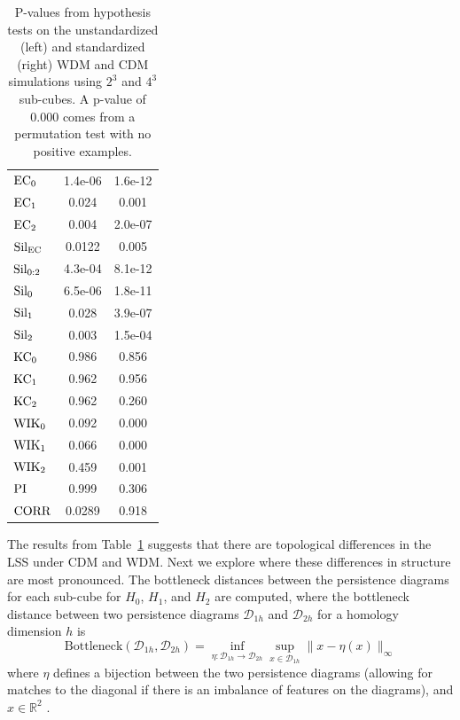 \documentclass[12pt]{article}
\begin{document}
\begin{table}[htp!]
\begin{center}
\begin{tabular}{ l | c |  c }
          $\textup{EC}_{0}$ & 1.4e-06 & 1.6e-12 \\
          $\textup{EC}_{1}$ & 0.024 & 0.001 \\
          $\textup{EC}_{2}$ & 0.004 & 2.0e-07 \\
          \midrule
          $\textup{Sil}_{\textup{EC}}$ & 0.0122 & 0.005 \\
          $\textup{Sil}_{0:2}$ & 4.3e-04 & 8.1e-12 \\
          $\textup{Sil}_{0}$ & 6.5e-06 & 1.8e-11 \\
          $\textup{Sil}_{1}$ & 0.028 & 3.9e-07 \\
          $\textup{Sil}_{2}$ & 0.003 & 1.5e-04 \\
          \midrule
          $\textup{KC}_{0}$ & 0.986 & 0.856 \\
          $\textup{KC}_{1}$ & 0.962 & 0.956 \\
          $\textup{KC}_{2}$ & 0.962 & 0.260 \\
          \midrule
          $\textup{WIK}_{0}$ & 0.092 & 0.000 \\
          $\textup{WIK}_{1}$ & 0.066 & 0.000 \\
          $\textup{WIK}_{2}$ & 0.459 & 0.001 \\
          $\textup{PI}$ & 0.999 & 0.306 \\
          \midrule
          $\textup{CORR}$ & 0.0289 & 0.918 \\
          \bottomrule
        \end{tabular}
    \end{center}
\caption{P-values from hypothesis tests on the unstandardized (left) and standardized (right) WDM and CDM simulations using $2^3$ and $4^3$ sub-cubes. A p-value of $0.000$ comes from a permutation test with no positive examples. 
}
\label{table:hypoCDMWDMresults}
\end{table}

The results from Table~\ref{table:hypoCDMWDMresults} suggests that there are topological differences in the LSS under CDM and WDM.  Next we explore where these differences in structure are most pronounced.  The bottleneck distances between the persistence diagrams for each sub-cube for $H_0$, $H_1$, and $H_2$ are computed, where the bottleneck distance between two persistence diagrams $\mathcal D_{1h}$ and $\mathcal D_{2h}$ for a homology dimension $h$ is
%
\begin{equation*}
\text{Bottleneck}(\mathcal D_{1h}, \mathcal D_{2h}) = \inf_{\eta: \mathcal D_{1h} \rightarrow \mathcal D_{2h}} \sup_{x \in \mathcal D_{1h}} \|x - \eta(x)  \|_{\infty}
\end{equation*}
%
where $\eta$ defines a bijection between the two persistence diagrams (allowing for matches to the diagonal if there is an imbalance of features on the diagrams), and $x \in \mathbb R^2$ \citep{edelsbrunner2010computational}.
\end{document}
